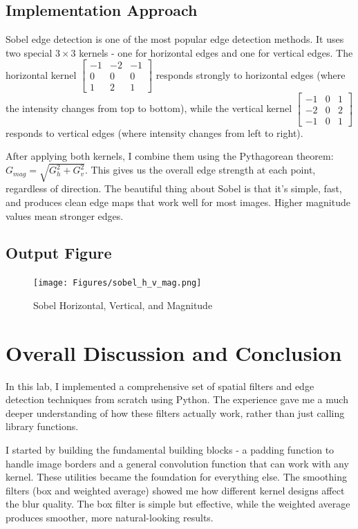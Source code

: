 \documentclass[12pt,a4paper]{report}
\begin{document}
\subsection{Implementation Approach}
Sobel edge detection is one of the most popular edge detection methods. It uses two special \(3\times 3\) kernels - one for horizontal edges and one for vertical edges. The horizontal kernel \(\begin{bmatrix}-1&-2&-1\\0&0&0\\1&2&1\end{bmatrix}\) responds strongly to horizontal edges (where the intensity changes from top to bottom), while the vertical kernel \(\begin{bmatrix}-1&0&1\\-2&0&2\\-1&0&1\end{bmatrix}\) responds to vertical edges (where intensity changes from left to right). 

After applying both kernels, I combine them using the Pythagorean theorem: \(G_{mag} = \sqrt{G_h^2 + G_v^2}\). This gives us the overall edge strength at each point, regardless of direction. The beautiful thing about Sobel is that it's simple, fast, and produces clean edge maps that work well for most images. Higher magnitude values mean stronger edges.

\subsection{Output Figure}
\begin{figure}[H]
\centering
\texttt{[image: Figures/sobel\_h\_v\_mag.png]}
\caption{Sobel Horizontal, Vertical, and Magnitude}
\end{figure}


\newpage
\section*{Overall Discussion and Conclusion}

In this lab, I implemented a comprehensive set of spatial filters and edge detection techniques from scratch using Python. The experience gave me a much deeper understanding of how these filters actually work, rather than just calling library functions.

I started by building the fundamental building blocks - a padding function to handle image borders and a general convolution function that can work with any kernel. These utilities became the foundation for everything else. The smoothing filters (box and weighted average) showed me how different kernel designs affect the blur quality. The box filter is simple but effective, while the weighted average produces smoother, more natural-looking results.
\end{document}
